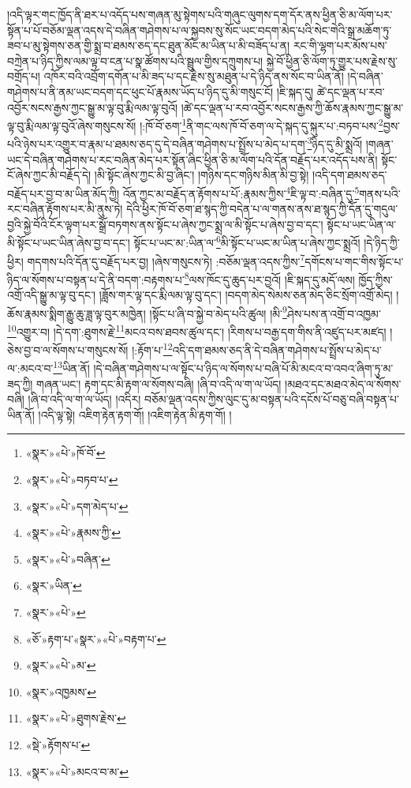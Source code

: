 །འདི་ལྟར་གང་ཁྱོད་ནི་ཐར་པ་འདོད་པས་གཞན་མུ་སྟེགས་པའི་གཞུང་ལུགས་དག་དོར་ནས་ཕྱིན་ཅི་མ་ལོག་པར་སྟོན་པ་པོ་བཅོམ་ལྡན་འདས་དེ་བཞིན་གཤེགས་པ་ལ་སྐྱབས་སུ་སོང་ཡང་བདག་མེད་པའི་སེང་གེའི་སྒྲ་མཆོག་ཏུ་ཟབ་པ་མུ་སྟེགས་ཅན་གྱི་སྨྲ་བ་ཐམས་ཅད་དང་ཐུན་མོང་མ་ཡིན་པ་མི་བཟོད་པ་ན། རང་གི་ལྷག་པར་མོས་པས་བཀྲེན་པ་ཉིད་ཀྱིས་ལམ་ལྟ་བ་ངན་པ་སྣ་ཚོགས་པའི་སྦྲུལ་གྱིས་དཀྲུགས་པ། སྐྱེ་བོ་ཕྱིན་ཅི་ལོག་ཏུ་གྱུར་པས་རྗེས་སུ་བགྲོད་པ། འཁོར་བའི་འབྲོག་དགོན་པ་མི་ཟད་པ་དང་རྗེས་སུ་མཐུན་པ་དེ་ཉིད་ནས་སོང་བ་ཡིན་ནོ། །དེ་བཞིན་གཤེགས་པ་ནི་ནམ་ཡང་བདག་དང་ཕུང་པོ་རྣམས་ཡོད་པ་ཉིད་དུ་མི་གསུང་ངོ། །ཇི་སྐད་དུ། ཚེ་དང་ལྡན་པ་རབ་འབྱོར་སངས་རྒྱས་ཀྱང་སྒྱུ་མ་ལྟ་བུ་རྨི་ལམ་ལྟ་བུའོ། །ཚེ་དང་ལྡན་པ་རབ་འབྱོར་སངས་རྒྱས་ཀྱི་ཆོས་རྣམས་ཀྱང་སྒྱུ་མ་ལྟ་བུ་རྨི་ལམ་ལྟ་བུའོ་ཞེས་གསུངས་སོ། །:ཁོ་བོ་ཅག་\footnote{«སྣར་»«པེ་»ཁོ་བོ་}ནི་གང་ལས་ཁོ་བོ་ཅག་ལ་དེ་སྐད་དུ་སྐུར་པ་:བཏབ་པས་\footnote{«སྣར་»«པེ་»བཏབ་པ་}བྱས་པའི་ཉེས་པར་འགྱུར་བ་རྣམ་པ་ཐམས་ཅད་དུ་དེ་བཞིན་གཤེགས་པ་སྤྲོས་པ་མེད་པ་དག་\footnote{«སྣར་»«པེ་»དག་མེད་པ་}ཉིད་དུ་མི་སྨྲའོ། །གཞན་ཡང་དེ་བཞིན་གཤེགས་པ་རང་བཞིན་མེད་པར་སྟོན་ཞིང་ཕྱིན་ཅི་མ་ལོག་པའི་དོན་བརྗོད་པར་འདོད་པས་ནི། སྟོང་ངོ་ཞེས་ཀྱང་མི་བརྗོད་དེ། །མི་སྟོང་ཞེས་ཀྱང་མི་བྱ་ཞིང་། །གཉིས་དང་གཉིས་མིན་མི་བྱ་སྟེ། །འདི་དག་ཐམས་ཅད་བརྗོད་པར་བྱ་བ་མ་ཡིན་མོད་ཀྱི། འོན་ཀྱང་མ་བརྗོད་ན་རྟོགས་པ་པོ་:རྣམས་ཀྱིས་\footnote{«སྣར་»«པེ་»རྣམས་ཀྱི་}ཇི་ལྟ་བ་:བཞིན་དུ་\footnote{«སྣར་»«པེ་»བཞིན་}གནས་པའི་རང་བཞིན་རྟོགས་པར་མི་ནུས་ཏེ། དེའི་ཕྱིར་ཁོ་བོ་ཅག་ཐ་སྙད་ཀྱི་བདེན་པ་ལ་གནས་ནས་ཐ་སྙད་ཀྱི་དོན་དུ་གདུལ་བྱའི་སྐྱེ་བོའི་ངོར་ལྟག་པར་སྒྲོ་བཏགས་ནས་སྟོང་པ་ཞེས་ཀྱང་སྨྲ་ལ་མི་སྟོང་པ་ཞེས་བྱ་བ་དང་། སྟོང་པ་ཡང་ཡིན་ལ་མི་སྟོང་པ་ཡང་ཡིན་ཞེས་བྱ་བ་དང་། སྟོང་པ་ཡང་མ་:ཡིན་ལ་\footnote{«སྣར་»ཡིན་}མི་སྟོང་པ་ཡང་མ་ཡིན་པ་ཞེས་ཀྱང་སྨྲའོ། །དེ་ཉིད་ཀྱི་ཕྱིར། གདགས་པའི་དོན་དུ་བརྗོད་པར་བྱ། །ཞེས་གསུངས་ཏེ། :བཅོམ་ལྡན་འདས་ཀྱིས་\footnote{«སྣར་»«པེ་»}དགོངས་པ་གང་གིས་སྟོང་པ་ཉིད་ལ་སོགས་པ་བསྟན་པ་དེ་ནི་བདག་:བརྟགས་པ་\footnote{«ཅོ་»རྟག་པ་«སྣར་»«པེ་»བརྟག་པ་}ལས་ཁོང་དུ་ཆུད་པར་བྱའོ། །ཇི་སྐད་དུ་མདོ་ལས། ཁྱོད་ཀྱིས་འགྲོ་འདི་སྒྱུ་མ་ལྟ་བུ་དང་། །ཟློས་གར་ལྟ་དང་རྨི་ལམ་ལྟ་བུ་དང་། །བདག་མེད་སེམས་ཅན་མེད་ཅིང་སྲོག་འགྲོ་མེད། །ཆོས་རྣམས་སྨིག་རྒྱུ་ཆུ་ཟླ་ལྟ་བུར་མཁྱེན། །སྟོང་པ་ཞི་བ་སྐྱེ་བ་མེད་པའི་ཚུལ། །མི་\footnote{«སྣར་»«པེ་»མ་}ཤེས་པས་ན་འགྲོ་བ་འཁྱམ་\footnote{«སྣར་»འཁྱམས་}འགྱུར་བ། །དེ་དག་:ཐུགས་རྗེ་\footnote{«སྣར་»«པེ་»ཐུགས་རྗེས་}མངའ་བས་ཐབས་ཚུལ་དང་། །རིགས་པ་བརྒྱ་དག་གིས་ནི་འཛུད་པར་མཛད། །ཅེས་བྱ་བ་ལ་སོགས་པ་གསུངས་སོ། །:རྟོག་པ་\footnote{«སྡེ་»རྟོགས་པ་}འདི་དག་ཐམས་ཅད་ནི་དེ་བཞིན་གཤེགས་པ་སྤྲོས་པ་མེད་པ་ལ་:མངའ་བ་\footnote{«སྣར་»«པེ་»མངའ་བ་མ་}ཡིན་ནོ། །དེ་བཞིན་གཤེགས་པ་ལ་སྟོང་པ་ཉིད་ལ་སོགས་པ་བཞི་པོ་མི་མངའ་བ་འབའ་ཞིག་ཏུ་མ་ཟད་ཀྱི། གཞན་ཡང་། རྟག་དང་མི་རྟག་ལ་སོགས་བཞི། །ཞི་བ་འདི་ལ་ག་ལ་ཡོད། །མཐའ་དང་མཐའ་མེད་ལ་སོགས་བཞི། །ཞི་བ་འདི་ལ་ག་ལ་ཡོད། །འདིར། བཅོམ་ལྡན་འདས་ཀྱིས་ལུང་དུ་མ་བསྟན་པའི་དངོས་པོ་བཅུ་བཞི་བསྟན་པ་ཡིན་ནོ། །འདི་ལྟ་སྟེ། འཇིག་རྟེན་རྟག་གོ། །འཇིག་རྟེན་མི་རྟག་གོ། །
